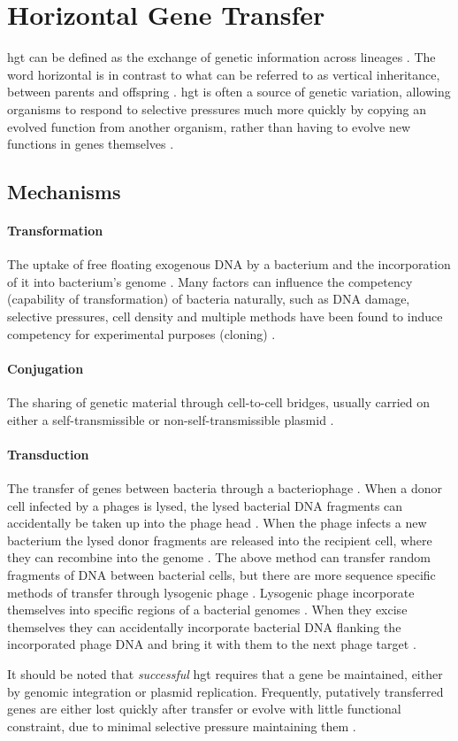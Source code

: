 \section*{Horizontal Gene Transfer}
\ac{hgt} can be defined as the exchange of genetic information across lineages \citep{lgt}.
The word horizontal is in contrast to what can be referred to as vertical inheritance, between parents and offspring \citep{ihgt}.
\ac{hgt} is often a source of genetic variation, allowing organisms to respond to selective pressures much more quickly by copying an evolved function from another organism, rather than having to evolve new functions in genes themselves \citep{ihgt,adaevo}.\par
\subsection*{Mechanisms}
\paragraph{Transformation}
The uptake of free floating exogenous DNA by a bacterium and the incorporation of it into bacterium's genome \citep{lgt}.
Many factors can influence the competency (capability of transformation) of bacteria naturally, such as DNA damage, selective pressures, cell density and multiple methods have been found to induce competency for experimental purposes (cloning) \citep{natcomp}.
\paragraph{Conjugation}
The sharing of genetic material through cell-to-cell bridges, usually carried on either a self-transmissible or non-self-transmissible plasmid \citep{conjug}.
\paragraph{Transduction}
The transfer of genes between bacteria through a bacteriophage \citep{transd}.
When a donor cell infected by a phages is lysed, the lysed bacterial DNA fragments can accidentally be taken up into the phage head \citep{transd}.
When the phage infects a new bacterium the lysed donor fragments are released into the recipient cell, where they can recombine into the genome \citep{transd}.
The above method can transfer random fragments of DNA between bacterial cells, but there are more sequence specific methods of transfer through lysogenic phage \citep{transd}.
Lysogenic phage incorporate themselves into specific regions of a bacterial genomes \citep{transd}.
When they excise themselves they can accidentally incorporate bacterial DNA flanking the incorporated phage DNA and bring it with them to the next phage target \citep{transd}.\par
It should be noted that \textit{successful} \ac{hgt} requires that a gene be maintained, either by genomic integration or plasmid replication.
Frequently, putatively transferred genes are either lost quickly after transfer or evolve with little functional constraint, due to minimal selective pressure maintaining them \citep{fastlane}.
